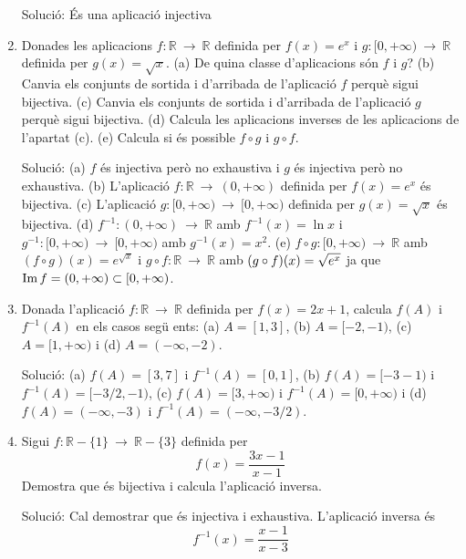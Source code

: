 \begin{enumerate}
Soluci\'{o}: \'{E}s una aplicaci\'{o} injectiva

\item Donades les aplicacions $f:\mathbb{R}~\longrightarrow ~\mathbb{R}$
definida per $f(x)=e^{x}$ i $g:[0,+\infty )~\longrightarrow ~\mathbb{R}$
definida per $g(x)=\sqrt{x}$. (a) De quina classe d'aplicacions s\'{o}n $f$
i $g$? (b) Canvia els conjunts de sortida i d'arribada de l'aplicaci\'{o} $f$
perqu\`{e} sigui bijectiva. (c) Canvia els conjunts de sortida i d'arribada
de l'aplicaci\'{o} $g$ perqu\`{e} sigui bijectiva. (d) Calcula les
aplicacions inverses de les aplicacions de l'apartat (c). (e) Calcula si
\'{e}s possible $f\circ g$ i $g\circ f$.

Soluci\'{o}: (a) $f$ \'{e}s injectiva per\`{o} no exhaustiva i $g$ \'{e}s
injectiva per\`{o} no exhaustiva. (b) L'aplicaci\'{o} $f:\mathbb{R}%
~\longrightarrow ~(0,+\infty )$ definida per $f(x)=e^{x}$ \'{e}s bijectiva.
(c) L'aplicaci\'{o} $g:[0,+\infty )~\longrightarrow ~[0,+\infty )$ definida
per $g(x)=\sqrt{x}$ \'{e}s bijectiva. (d) $f^{-1}:(0,+\infty
)~\longrightarrow ~\mathbb{R}$ amb $f^{-1}(x)=\ln x$ i $g^{-1}:[0,+\infty
)~\longrightarrow ~[0,+\infty )$ amb $g^{-1}(x)=x^{2}$. (e) $f\circ
g:[0,+\infty )~\longrightarrow ~\mathbb{R}$ amb $(f\circ g)(x)=e^{\sqrt{x}}$
i $g\circ f:\mathbb{R}~\longrightarrow ~\mathbb{R}$ amb $(g\circ f)(x)=\sqrt{%
e^{x}}$ ja que $\mathop{\rm Im}\nolimits f=(0,+\infty )\subset \lbrack 0,+\infty )$.

\item Donada l'aplicaci\'{o} $f:\mathbb{R}~\longrightarrow ~\mathbb{R}$
definida per $f(x)=2x+1$, calcula $f(A)$ i $f^{-1}(A)$ en els casos seg\"{u}%
ents: (a) $A=[1,3]$, (b) $A=[-2,-1)$, (c) $A=[1,+\infty )$ i (d) $A=(-\infty
,-2)$.

Soluci\'{o}: (a) $f(A)=[3,7]$ i $f^{-1}(A)=[0,1]$, (b) $f(A)=[-3-1)$ i $%
f^{-1}(A)=[-3/2,-1)$, (c) $f(A)=[3,+\infty )$ i $f^{-1}(A)=[0,+\infty )$ i
(d) $f(A)=(-\infty ,-3)$ i $f^{-1}(A)=(-\infty ,-3/2)$.

\item Sigui $f:\mathbb{R}-\{1\}~\longrightarrow ~\mathbb{R}-\{3\}$ definida
per%
\begin{equation*}
f(x)=\frac{3x-1}{x-1}
\end{equation*}%
Demostra que \'{e}s bijectiva i calcula l'aplicaci\'{o} inversa.

Soluci\'{o}: Cal demostrar que \'{e}s injectiva i exhaustiva. L'aplicaci\'{o}
inversa \'{e}s%
\begin{equation*}
f^{-1}(x)=\frac{x-1}{x-3}
\end{equation*}
\end{enumerate}


